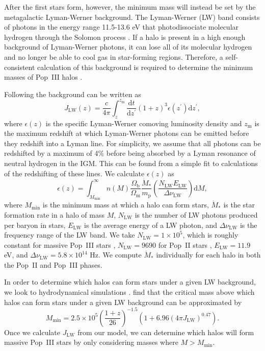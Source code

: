 \documentclass[a4paper,fleqn,usenatbib]{mnras}
\begin{document}
After the first stars 
form, however, the minimum mass will instead be set by the metagalactic Lyman-Werner background. The Lyman-Werner (LW) band consists of photons in the energy range 11.5-13.6 eV that photodissociate molecular hydrogen through the Solomon process \citep[see][]{solomon}.  If a halo is present in a high enough background of Lyman-Werner photons, it can lose all of its molecular hydrogen and no longer be able to cool gas in star-forming regions.  Therefore, a self-consistent calculation of this background is required to determine the minimum masses of Pop~III halos 
\citep[see][]{haiman_1997, holzbauer_2012, visbal_2014}.

Following \citet{visbal_2014} the background can be written as
\begin{equation}
J_{\text{LW}}(z) = \frac{c}{4\pi} \int_{z}^{z_{\text{m}}}  
\frac{\text{d}t}{\text{d}z^\prime} \left(1+z\right)^3 \epsilon(z^\prime)
\text{d}z^\prime,
\label{eq:jlw}
\end{equation}
where $\epsilon(z)$ is the specific Lyman-Werner comoving luminosity density and $z_\text{m}$ is the maximum redshift at which Lyman-Werner photons can be emitted before they redshift into a Lyman line.  For simplicity, we assume that all photons can be redshifted by a maximum of 4\% \citep[][]{visbal_2014} before being absorbed by a Lyman resonance of neutral hydrogen in the IGM. This can be found from a simple fit to calculations of the redshifting of these lines.  We calculate $\epsilon(z)$ as
\begin{equation}
\epsilon(z) = \int_{M_\text{min}}^{\infty} n(M) 
\frac{\Omega_{\text{b}}}{\Omega_{\text{m}}} \frac{\dot{M}_\ast}{m_{\text{p}}} 
\left( \frac{N_{\text{LW}} E_{\text{LW}}}{\Delta \nu_{\text{LW}}} \right) 
 \text{d}M,
\end{equation}
where $M_\text{min}$ is the minimum mass at which a halo can form stars,
$\dot{M}_\ast$ is the star formation rate in a halo of mass $M$, $N_\text{LW}$ is the number of LW photons produced per baryon in stars, $E_\text{LW}$ is the average energy of a LW photon, and $\Delta \nu_{\text{LW}}$ is the frequency range of the LW band.  We take $N_\text{LW} = 1 \times 10^5$, which is 
roughly constant for massive Pop~III stars \citep{schaerer_2002}, $N_\text{LW} = 9690$ for Pop~II stars \citep{barkana_2005}, $E_\text{LW} = 11.9$  eV, and $\Delta \nu_{\text{LW}} = 5.8 \times 10^{14}$ Hz.  We compute $\dot{M}_\ast$ individually for each halo in both the Pop~II and Pop~III phases.

In order to determine which halos can form stars under a given LW background, we look to hydrodynamical simulations \citep[e.g.,][]{machacek_2001, wise_abel_2007, oshea_norman_2008}.  \citet{visbal_2014} find that the critical mass above which halos can form stars under a given LW background can be approximated by
\begin{equation}
M_{\text{min}} = 2.5 \times 10^5 \left( \frac{1+z}{26} \right)^{-1.5} 
\left( 1 + 6.96 \left( 4\pi J_{\text{LW}} \right)^{0.47}\right).
\label{eq:mcrit}
\end{equation}
Once we calculate $J_\text{LW}$ from our model, we can determine which halos will form massive Pop~III stars by only considering masses where $M > M_\text{min}$.
\end{document}
